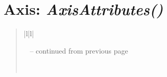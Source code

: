 \documentclass[letterpaper,10pt,english]{sphinxmanual}
\begin{document}
\section{\textbf{Axis}: \emph{AxisAttributes()}}
\label{attributes:axis-axisattributes}
\begin{DUlineblock}{0em}
\item[] 
\end{DUlineblock}
\begin{quote}

\begin{longtable}{|l|l|}
\hline
\endfirsthead

%
{{\textsf{\tablename\ \thetable{} -- continued from previous page}}} \\
\hline
\endhead

\hline {} \\ \hline
\endfoot

\endlastfoot



\end{longtable}
\end{quote}
\end{document}
